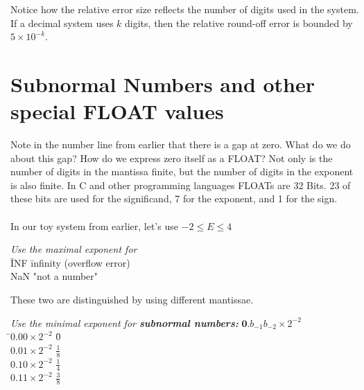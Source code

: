 \documentclass[a4paper,12pt,]{report}
\begin{document}
	Notice how the relative error size reflects the number of digits used in the system. If a decimal 
	system uses $k$ digits, then the relative round-off error is bounded by $5 \times 10^{-k}$.\\


\section{Subnormal Numbers and other special FLOAT values}

	Note in the number line from earlier that there is a gap at zero.  What do we do about this gap?  
	How do we express zero itself as a FLOAT? Not only is the number of digits in the mantissa finite, 
	but the number of digits in the exponent is also finite. In C and other programming languages 
	FLOATs are 32 Bits.  23 of these bits are used for the significand, 7 for the exponent, and 1 for the 
	sign.\\ \\

	In our toy system from earlier, let's use $-2\leq  E \leq 4$
	
\begin{tabbing}
	\hspace*{2cm}\= \textit{Use the maximal exponent for} \\
	\hspace*{3cm}\=INF \hspace*{1cm} \=  infinity (overflow error)\\
	\> NaN \> "not a number"
\end{tabbing}

	These two are distinguished by using different mantissae.

\begin{tabbing}
	\hspace*{2cm}\= \textit{Use the minimal exponent for \textbf{subnormal numbers:}}
		$\textbf{0}.b_{-1}b_{-2}\times 2^{-2}$ \\
	\hspace*{3cm}\=$0.00\times 2^{-2}$ \hspace*{1cm} \=  0\\
	\>$0.01\times 2^{-2}$ \>$\frac{1}{8}$\\
	\>$0.10\times 2^{-2}$ \>$\frac{1}{4}$\\
	\>$0.11\times 2^{-2}$ \>$\frac{3}{8}$\\
\end{tabbing}
\end{document}
